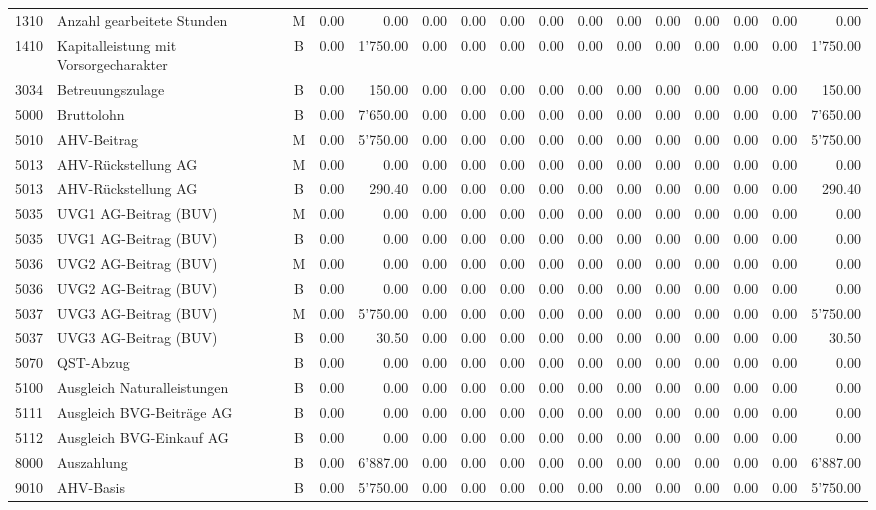 \documentclass[8pt,a4paper]{extarticle}
\begin{document}
\begin{longtable}{@{\extracolsep{\fill}} l l c r r r r r r r r r r r r r}
1310&Anzahl gearbeitete Stunden&M&0.00&0.00&0.00&0.00&0.00&0.00&0.00&0.00&0.00&0.00&0.00&0.00&0.00\\
1410&Kapitalleistung mit Vorsorgecharakter&B&0.00&1'750.00&0.00&0.00&0.00&0.00&0.00&0.00&0.00&0.00&0.00&0.00&1'750.00\\
3034&Betreuungszulage&B&0.00&150.00&0.00&0.00&0.00&0.00&0.00&0.00&0.00&0.00&0.00&0.00&150.00\\
5000&Bruttolohn&B&0.00&7'650.00&0.00&0.00&0.00&0.00&0.00&0.00&0.00&0.00&0.00&0.00&7'650.00\\
5010&AHV-Beitrag&M&0.00&5'750.00&0.00&0.00&0.00&0.00&0.00&0.00&0.00&0.00&0.00&0.00&5'750.00\\
5013&AHV-Rückstellung AG&M&0.00&0.00&0.00&0.00&0.00&0.00&0.00&0.00&0.00&0.00&0.00&0.00&0.00\\
5013&AHV-Rückstellung AG&B&0.00&290.40&0.00&0.00&0.00&0.00&0.00&0.00&0.00&0.00&0.00&0.00&290.40\\
5035&UVG1 AG-Beitrag (BUV)&M&0.00&0.00&0.00&0.00&0.00&0.00&0.00&0.00&0.00&0.00&0.00&0.00&0.00\\
5035&UVG1 AG-Beitrag (BUV)&B&0.00&0.00&0.00&0.00&0.00&0.00&0.00&0.00&0.00&0.00&0.00&0.00&0.00\\
5036&UVG2 AG-Beitrag (BUV)&M&0.00&0.00&0.00&0.00&0.00&0.00&0.00&0.00&0.00&0.00&0.00&0.00&0.00\\
5036&UVG2 AG-Beitrag (BUV)&B&0.00&0.00&0.00&0.00&0.00&0.00&0.00&0.00&0.00&0.00&0.00&0.00&0.00\\
5037&UVG3 AG-Beitrag (BUV)&M&0.00&5'750.00&0.00&0.00&0.00&0.00&0.00&0.00&0.00&0.00&0.00&0.00&5'750.00\\
5037&UVG3 AG-Beitrag (BUV)&B&0.00&30.50&0.00&0.00&0.00&0.00&0.00&0.00&0.00&0.00&0.00&0.00&30.50\\
5070&QST-Abzug&B&0.00&0.00&0.00&0.00&0.00&0.00&0.00&0.00&0.00&0.00&0.00&0.00&0.00\\
5100&Ausgleich Naturalleistungen&B&0.00&0.00&0.00&0.00&0.00&0.00&0.00&0.00&0.00&0.00&0.00&0.00&0.00\\
5111&Ausgleich BVG-Beiträge AG&B&0.00&0.00&0.00&0.00&0.00&0.00&0.00&0.00&0.00&0.00&0.00&0.00&0.00\\
5112&Ausgleich BVG-Einkauf AG&B&0.00&0.00&0.00&0.00&0.00&0.00&0.00&0.00&0.00&0.00&0.00&0.00&0.00\\
8000&Auszahlung&B&0.00&6'887.00&0.00&0.00&0.00&0.00&0.00&0.00&0.00&0.00&0.00&0.00&6'887.00\\
9010&AHV-Basis&B&0.00&5'750.00&0.00&0.00&0.00&0.00&0.00&0.00&0.00&0.00&0.00&0.00&5'750.00\\

\end{longtable}
\end{document}
